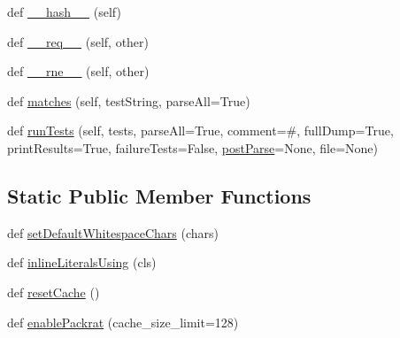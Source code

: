 \begin{DoxyCompactItemize}
\item 
def \hyperlink{classpip_1_1__vendor_1_1pyparsing_1_1ParserElement_a0a833f0157c56262b4cdd88a235ebd5a}{\+\_\+\+\_\+hash\+\_\+\+\_\+} (self)
\item 
def \hyperlink{classpip_1_1__vendor_1_1pyparsing_1_1ParserElement_a80a864449042b8881210de6dd64b6a4b}{\+\_\+\+\_\+req\+\_\+\+\_\+} (self, other)
\item 
def \hyperlink{classpip_1_1__vendor_1_1pyparsing_1_1ParserElement_a3209c7727a6a76ff090a899ee12c9010}{\+\_\+\+\_\+rne\+\_\+\+\_\+} (self, other)
\item 
def \hyperlink{classpip_1_1__vendor_1_1pyparsing_1_1ParserElement_a084411e07bcb35c98555fbeb7bd617bf}{matches} (self, test\+String, parse\+All=True)
\item 
def \hyperlink{classpip_1_1__vendor_1_1pyparsing_1_1ParserElement_a71d16b0991eaeafbf39a7e2edb76cfc3}{run\+Tests} (self, tests, parse\+All=True, comment=\textquotesingle{}\#\textquotesingle{}, full\+Dump=True, print\+Results=True, failure\+Tests=False, \hyperlink{classpip_1_1__vendor_1_1pyparsing_1_1ParserElement_a3dd7af04f05341b7bdb3d045ed25094a}{post\+Parse}=None, file=None)
\end{DoxyCompactItemize}
\subsection*{Static Public Member Functions}
\begin{DoxyCompactItemize}
\item 
def \hyperlink{classpip_1_1__vendor_1_1pyparsing_1_1ParserElement_a5979c2ba590325f51c5f4096a39a4a50}{set\+Default\+Whitespace\+Chars} (chars)
\item 
def \hyperlink{classpip_1_1__vendor_1_1pyparsing_1_1ParserElement_abf245d50cf0b9de45b5453647caa1b71}{inline\+Literals\+Using} (cls)
\item 
def \hyperlink{classpip_1_1__vendor_1_1pyparsing_1_1ParserElement_a82502236700f148e8e9e096f4d6ec180}{reset\+Cache} ()
\item 
def \hyperlink{classpip_1_1__vendor_1_1pyparsing_1_1ParserElement_aecf2e7774e67bd46c7ac4caa0152ebf7}{enable\+Packrat} (cache\+\_\+size\+\_\+limit=128)
\end{DoxyCompactItemize}
